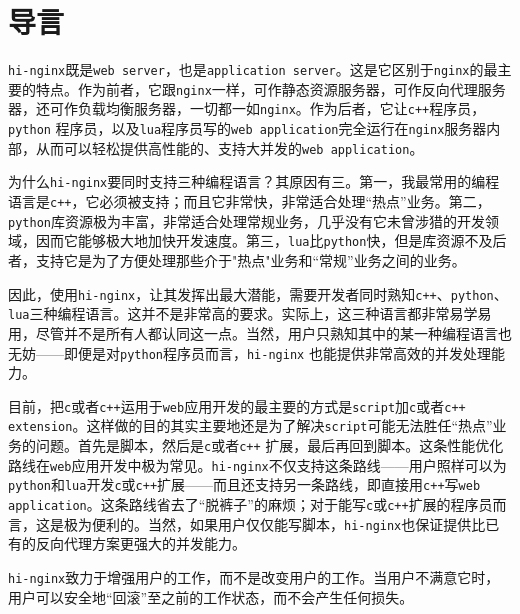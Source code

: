 \section{导言}
\texttt{hi-nginx}既是\texttt{web server}，也是\texttt{application server}。这是它区别于\texttt{nginx}的最主要的特点。作为前者，它跟\texttt{nginx}一样，可作静态资源服务器，可作反向代理服务器，还可作负载均衡服务器，一切都一如\texttt{nginx}。作为后者，它让\texttt{c++}程序员，\texttt{python} 程序员，以及\texttt{lua}程序员写的\texttt{web application}完全运行在\texttt{nginx}服务器内部，从而可以轻松提供高性能的、支持大并发的\texttt{web application}。

为什么\texttt{hi-nginx}要同时支持三种编程语言？其原因有三。第一，我最常用的编程语言是\texttt{c++}，它必须被支持；而且它非常快，非常适合处理“热点”业务。第二，\texttt{python}库资源极为丰富，非常适合处理常规业务，几乎没有它未曾涉猎的开发领域，因而它能够极大地加快开发速度。第三，\texttt{lua}比\texttt{python}快，但是库资源不及后者，支持它是为了方便处理那些介于"热点"业务和“常规”业务之间的业务。

因此，使用\texttt{hi-nginx}，让其发挥出最大潜能，需要开发者同时熟知\texttt{c++}、\texttt{python}、\texttt{lua}三种编程语言。这并不是非常高的要求。实际上，这三种语言都非常易学易用，尽管并不是所有人都认同这一点。当然，用户只熟知其中的某一种编程语言也无妨——即便是对\texttt{python}程序员而言，\texttt{hi-nginx}	也能提供非常高效的并发处理能力。

目前，把\texttt{c}或者\texttt{c++}运用于\texttt{web}应用开发的最主要的方式是\texttt{script}加\texttt{c}或者\texttt{c++} \texttt{extension}。这样做的目的其实主要地还是为了解决\texttt{script}可能无法胜任“热点”业务的问题。首先是脚本，然后是\texttt{c}或者\texttt{c++} 扩展，最后再回到脚本。这条性能优化路线在\texttt{web}应用开发中极为常见。\texttt{hi-nginx}不仅支持这条路线——用户照样可以为\texttt{python}和\texttt{lua}开发\texttt{c}或\texttt{c++}扩展——而且还支持另一条路线，即直接用\texttt{c++}写\texttt{web application}。这条路线省去了“脱裤子”的麻烦；对于能写\texttt{c}或\texttt{c++}扩展的程序员而言，这是极为便利的。当然，如果用户仅仅能写脚本，\texttt{hi-nginx}也保证提供比已有的反向代理方案更强大的并发能力。

\texttt{hi-nginx}致力于增强用户的工作，而不是改变用户的工作。当用户不满意它时，用户可以安全地“回滚”至之前的工作状态，而不会产生任何损失。